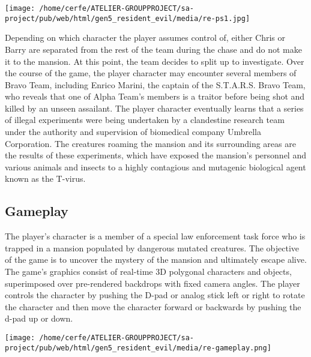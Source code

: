 \documentclass[a4paper,10pt]{book}
\begin{document}
 \texttt{[image: /home/cerfe/ATELIER-GROUPPROJECT/sa-project/pub/web/html/gen5\_resident\_evil/media/re-ps1.jpg]}
 
            Depending on which character the player assumes control of, either Chris or Barry are separated from the rest of the team during the chase and do not make it to the mansion. 
            At this point, the team decides to split up to investigate. 
            Over the course of the game, the player character may encounter several members of Bravo Team, including Enrico Marini, the captain of the S.T.A.R.S. Bravo Team, who reveals that one of Alpha Team's members is a traitor before being shot and killed by an unseen assailant. 
            The player character eventually learns that a series of illegal experiments were being undertaken by a clandestine research team under the authority and supervision of biomedical company Umbrella Corporation. 
            The creatures roaming the mansion and its surrounding areas are the results of these experiments, which have exposed the mansion's personnel and various animals and insects to a highly contagious and mutagenic biological agent known as the T-virus.

         
 \subsection{Gameplay }
 
            The player's character is a member of a special law enforcement task force who is trapped in a mansion populated by dangerous mutated creatures. 
            The objective of the game is to uncover the mystery of the mansion and ultimately escape alive. 
            The game's graphics consist of real-time 3D polygonal characters and objects, superimposed over pre-rendered backdrops with fixed camera angles. 
            The player controls the character by pushing the D-pad or analog stick left or right to rotate the character and then move the character forward or backwards by pushing the d-pad up or down.
         
 \texttt{[image: /home/cerfe/ATELIER-GROUPPROJECT/sa-project/pub/web/html/gen5\_resident\_evil/media/re-gameplay.png]}
 
\end{document}
